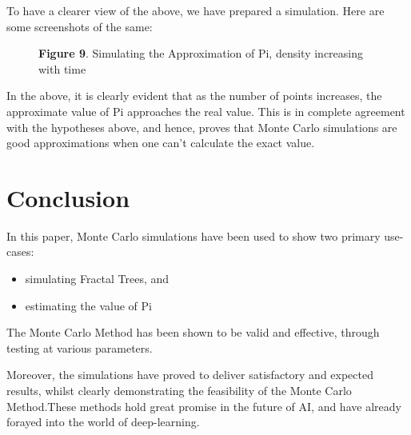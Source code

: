 \documentclass{resonance}
\begin{document}
To have a clearer view of the above, we have prepared a simulation. Here are some screenshots of the same:

\begin{figure}[h!]
	\hskip 0.7cm
    \vspace{20pt}
    \fbox{\texttt{[image: pi\_ss\_1]}}
    \fbox{\texttt{[image: pi\_ss\_2]}}
    \fbox{\texttt{[image: pi\_ss\_3]}}
    
    \vspace{-10pt}
    \hspace{30pt}\scriptsize{\textbf{Figure 9}. \normalfont Simulating the Approximation of Pi, density increasing with time}\\
\end{figure}
In the above, it is clearly evident that as the number of points increases, the approximate value of Pi approaches the real value. This is in complete agreement with the hypotheses above, and hence, proves that Monte Carlo simulations are good approximations when one can’t calculate the exact value.

\section{Conclusion}
In this paper, Monte Carlo simulations have been used to show two primary use-cases:
\begin{itemize}
\item simulating Fractal Trees, and
\item estimating the value of Pi
\end{itemize}

The Monte Carlo Method has been shown to be valid and effective, through testing at various parameters.

Moreover, the simulations have proved to deliver satisfactory and expected results, whilst clearly demonstrating the feasibility of the Monte Carlo Method.These methods hold great promise in the future of AI, and have already forayed into the world of deep-learning.\\\\\\\\\\\\\\\\
\end{document}
